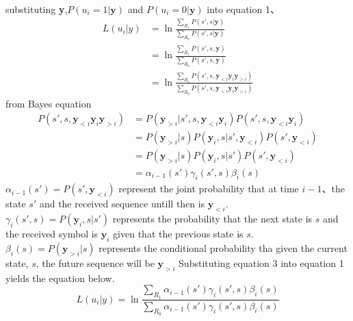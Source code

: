 \documentclass[20 pts]{article}
\begin{document}
\paragraph{}
substituting \textbf{y},$P(u_i=1|\boldsymbol{y})$ and $P(u_i=0|\boldsymbol{y})$ into equation 1、
\begin{equation}
\begin{split}
L(u_i|y)&=\ln\frac{\sum_{R_1}^{}P(s',s|\boldsymbol{y})}{\sum_{R_0}^{}P(s',s|\boldsymbol{y})}\\
&=\ln\frac{\sum_{R_1}^{}P(s',s,\boldsymbol{y})}{\sum_{R_0}^{}P(s',s,\boldsymbol{y})}\\
&=\ln\frac{\sum_{R_1}^{}P(s',s,\boldsymbol{y}_{<i} \boldsymbol{y}_i \boldsymbol{y}_{>i})}{\sum_{R_0}^{}P(s',s,\boldsymbol{y}_{<i} \boldsymbol{y}_i \boldsymbol{y}_{>i})}
\end{split}
\end{equation}
from Bayes equation
\begin{equation}
\begin{split}
P(s',s,\boldsymbol{y}_{<i} \boldsymbol{y}_i \boldsymbol{y}_{>i})&=P(\boldsymbol{y}_{>i}|s',s,\boldsymbol{y}_{<i}\boldsymbol{y}_{i})P(s',s,\boldsymbol{y}_{<i}\boldsymbol{y}_{i})\\
&=P(\boldsymbol{y}_{>i}|s)P(\boldsymbol{y}_{i},s|s',\boldsymbol{y}_{<i})P(s',\boldsymbol{y}_{<i})\\
&=P(\boldsymbol{y}_{>i}|s)P(\boldsymbol{y}_{i},s|s')P(s',\boldsymbol{y}_{<i})\\
&=\alpha_{i-1}(s')\gamma_i(s',s)\beta_i(s)
\end{split}
\end{equation}
$\alpha_{i-1}(s')=P(s',\boldsymbol{y}_{<i})$ represent the joint probability that at time $i-1$、the state $s'$ and the received sequence untill then is $\boldsymbol{y}_{<i}$.\\
$\gamma_i(s',s)=P(\boldsymbol{y}_{i},s|s')$ represents the probability that the next state is $s$ and the received symbol is $\boldsymbol{y}_{i}$ given that the previous state is $s$.\\
$\beta_i(s)=P(\boldsymbol{y}_{>i}|s)$ represents the conditional probability tha given the current state, $s$, the future sequence will be $\boldsymbol{y}_{>i}$
Substituting equation 3 into equation 1 yields the equation below.
\begin{equation}L(u_i|y)=\ln\frac{\sum_{R_1}^{}\alpha_{i-1}(s')\gamma_i(s',s)\beta_i(s)}{\sum_{R_0}^{}\alpha_{i-1}(s')\gamma_i(s',s)\beta_i(s)}\end{equation}
\end{document}

